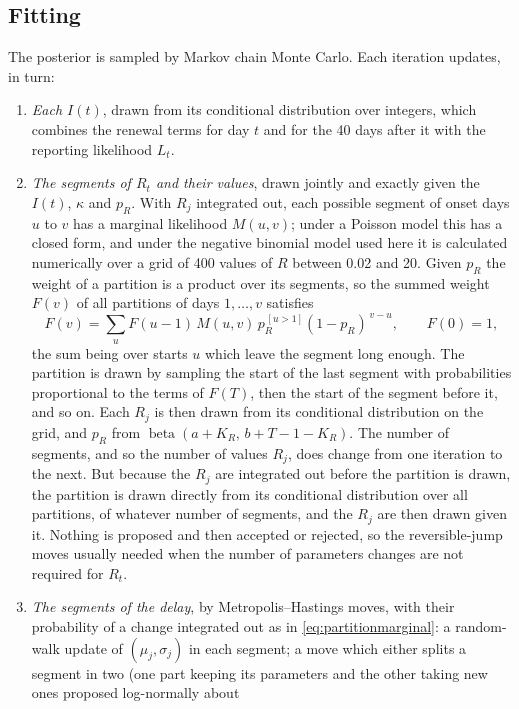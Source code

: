 \documentclass[11pt,a4paper]{article}
\begin{document}
\subsection{Fitting}

The posterior is sampled by Markov chain Monte Carlo. Each iteration updates,
in turn:
\begin{enumerate}[itemsep=2pt]
\item \emph{Each $I(t)$}, drawn from its conditional distribution over
integers, which combines the renewal terms for day $t$ and for the 40 days
after it with the reporting likelihood $L_t$.
\item \emph{The segments of $R_t$ and their values}, drawn jointly and exactly
given the $I(t)$, $\kappa$ and $p_R$. With $R_j$ integrated out, each
possible segment of onset days $u$ to $v$ has a marginal likelihood $M(u,v)$;
under a Poisson model this has a closed form, and under the negative binomial
model used here it is calculated numerically over a grid of 400 values of
$R$ between 0.02 and 20. Given $p_R$ the weight of a partition is a product
over its segments, so the summed weight $F(v)$ of all partitions of days
$1,\dots,v$ satisfies
\begin{equation}\label{eq:partitionforward}
F(v)=\sum_{u}F(u-1)\,M(u,v)\,p_R^{\,[u>1]}(1-p_R)^{\,v-u},\qquad F(0)=1,
\end{equation}
the sum being over starts $u$ which leave the segment long enough. The
partition is drawn by sampling the start of the last segment with
probabilities proportional to the terms of $F(T)$, then the start of the
segment before it, and so on. Each $R_j$ is then drawn from its conditional
distribution on the grid, and $p_R$ from
$\operatorname{beta}(a+K_R,\,b+T-1-K_R)$. The number of segments, and so
the number of values $R_j$, does change from one iteration to the next. But
because the $R_j$ are integrated out before the partition is drawn, the
partition is drawn directly from its conditional distribution over all
partitions, of whatever number of segments, and the $R_j$ are then drawn given
it. Nothing is proposed and then accepted or rejected, so the reversible-jump
moves usually needed when the number of parameters changes are not required
for $R_t$.
\item \emph{The segments of the delay}, by Metropolis--Hastings moves, with
their probability of a change integrated out as in
\eqref{eq:partitionmarginal}: a random-walk update of $(\mu_j,\sigma_j)$ in
each segment; a move which either splits a segment in two (one part keeping
its parameters and the other taking new ones proposed log-normally about

\end{enumerate}
\end{document}
